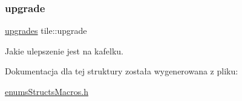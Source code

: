 \subsubsection{\texorpdfstring{upgrade}{upgrade}}
{\footnotesize\ttfamily \mbox{\hyperlink{enums_structs_macros_8h_a309b25f23fe120468075b0bf109cc4a2}{upgrades}} tile\+::upgrade}

Jakie ulepszenie jest na kafelku. 

Dokumentacja dla tej struktury została wygenerowana z pliku\+:\begin{DoxyCompactItemize}
\item 
\mbox{\hyperlink{enums_structs_macros_8h}{enums\+Structs\+Macros.\+h}}\end{DoxyCompactItemize}
